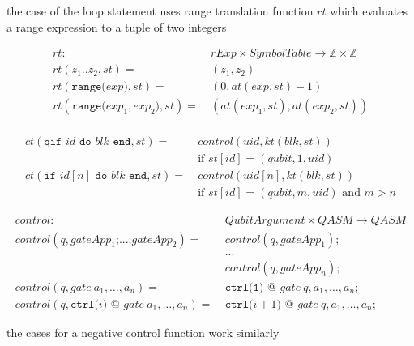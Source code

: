 the case of the loop statement uses range translation function $rt$ which evaluates a range expression to a tuple of two integers 

\begin{align*}
    rt : \ & rExp \times SymbolTable \to \mathbb{Z} \times \mathbb{Z}\\
    rt(z_1 .. z_2, st)  = \ & (z_1, z_2)\\
    rt(\texttt{range(} exp \texttt{)}, st) = \ & (0, at(exp, st) - 1)\\
    rt(\texttt{range(} exp_1, exp_2 \texttt{)}, st) = \ & (at(exp_1, st), at(exp_2, st))\\
\end{align*}

\begin{align*}
        ct(\texttt{qif } id \texttt{ do } blk \texttt{ end}, st) = \ 
            &  control(uid, kt(blk, st)) \\
            & \text{if } st[id] = (qubit, 1, uid)\\
        ct(\texttt{if } id[n] \texttt{ do } blk \texttt{ end}, st) = \ 
            &  control(uid[n], kt(blk, st)) \\
            & \text{if } st[id] = (qubit, m, uid) \text{ and } m > n
\end{align*}


\begin{align*}
    control : \ & QubitArgument \times QASM \to QASM\\
    control(q, gateApp_1\texttt{;} ...\texttt{;} gateApp_2) = \ & control(q, gateApp_1)\texttt{;}\\
        & ...\\
        & control(q, gateApp_n)\texttt{;}\\
    control(q, gate \ a_1, \dots, a_n ) = \ & \texttt{ctrl(1) @ } gate \ q, a_1, \dots, a_n\texttt{;}\\
    control(q, \texttt{ctrl(}i \texttt{) @ } gate \ a_1, \dots, a_n ) = \ & \texttt{ctrl(}i+1 \texttt{) @ } gate \ q, a_1, \dots, a_n\texttt{;}
\end{align*}

the cases for a negative control function work similarly